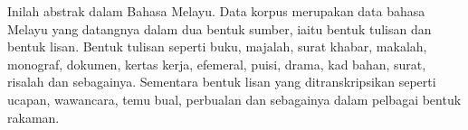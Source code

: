 \begin{msAbstract}
Inilah abstrak dalam Bahasa Melayu. Data korpus merupakan data bahasa
Melayu yang datangnya dalam dua bentuk sumber, iaitu bentuk tulisan
dan bentuk lisan. Bentuk tulisan seperti buku, majalah, surat khabar,
makalah, monograf, dokumen, kertas kerja, efemeral, puisi, drama,
kad bahan, surat, risalah dan sebagainya. Sementara bentuk lisan yang
ditranskripsikan seperti ucapan, wawancara, temu bual, perbualan dan
sebagainya dalam pelbagai bentuk rakaman.
\end{msAbstract}
